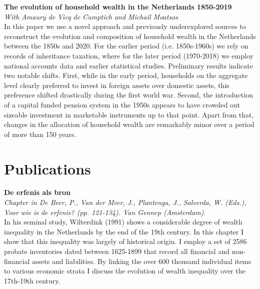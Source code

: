 \documentclass[9pt]{article}
\begin{document}
\noindent \textbf{The evolution of household wealth in the Netherlands 1850-2019} \\
\noindent\textit{With Amaury de Vicq de Cumptich and Michail Moatsos} \\
In this paper we use a novel approach and previously underexplored sources to reconstruct the evolution and composition of household wealth in the Netherlands between the 1850s and 2020. For the earlier period (i.e. 1850s-1960s) we rely on records of inheritance taxation, where for the later period (1970-2018) we employ national accounts data and earlier statistical studies. 
Preliminary results indicate two notable shifts. First, while in the early period, households on the aggregate level clearly preferred to invest in foreign assets over domestic assets, this preference shifted drastically during the first world war. Second, the introduction of a capital funded pension system in the 1950s appears to have crowded out sizeable investment in marketable instruments up to that point. Apart from that, changes in the allocation of household wealth are remarkably minor over a period of more than 150 years. \vspace{-5pt}	

\vspace{-5pt}\section*{Publications}\vspace{-7pt}
\noindent \textbf{De erfenis als bron} \\
\textit{Chapter in De Beer, P., Van der Meer, J., Plantenga, J., Salverda, W. (Eds.), Voor wie is de erfenis? (pp. 121-134). Van Gennep (Amsterdam).}\\
	In his seminal study, Wilterdink (1991) shows a considerable degree of wealth inequality in the Netherlands by the end of the 19th century. In this chapter I show that this inequality was largely of historical origin. I employ a set of 2586 probate inventories dated between 1625-1899 that record all financial and non-financial assets and liabilities. By linking the over 600 thousand individual items to various economic strata I discuss the evolution of wealth inequality over the 17th-19th century. 
\end{document}
